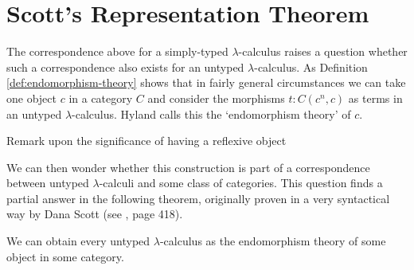 \section{Scott's Representation Theorem}
The correspondence above for a simply-typed $ \lambda $-calculus raises a question whether such a correspondence also exists for an untyped $ \lambda $-calculus. As Definition \ref{def:endomorphism-theory} shows that in fairly general circumstances we can take one object $ c $ in a category $ C $ and consider the morphisms $ t: C(c^n, c) $ as terms in an untyped $ \lambda $-calculus. Hyland calls this the `endomorphism theory' of $ c $.

\TODO Remark upon the significance of having a reflexive object

We can then wonder whether this construction is part of a correspondence between untyped $ \lambda $-calculi and some class of categories. This question finds a partial answer in the following theorem, originally proven in a very syntactical way by Dana Scott (see \cite{curry}, page 418).
\begin{lemma}
  We can obtain every untyped $ \lambda $-calculus as the endomorphism theory of some object in some category.
\end{lemma}
